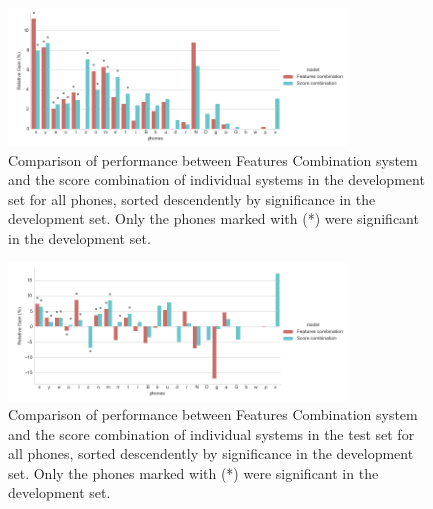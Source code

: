 \begin{figure}[H]
	\centering
	\includegraphics[width=0.8\textwidth]{files/figures/results/relatives/relatives-fusion-systems-dev-all.png}
	\caption{Comparison of performance between Features Combination system and the score combination
	of individual systems in the development set for all phones, sorted descendently by significance
	in the development set. Only the phones marked with (*) were significant in the development set.}
	\label{fig:fusionAllDev}
\end{figure}

\begin{figure}[H]
	\centering
	\includegraphics[width=0.8\textwidth]{files/figures/results/relatives/relative-fusion-systems-heldout-all.png}
	\caption{Comparison of performance between Features Combination system and the score combination
	of individual systems in the test set for all phones, sorted descendently by significance
	in the development set. Only the phones marked with (*) were significant in the development set.}
	\label{fig:fusionAllHeldout}
\end{figure}
